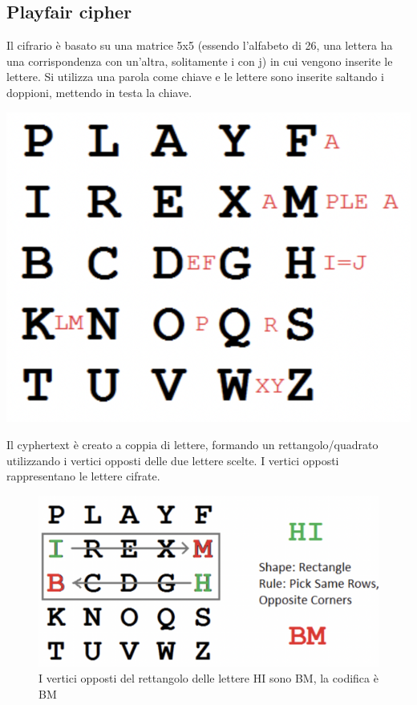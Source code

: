 \documentclass[11pt, oneside]{article}   	%
\begin{document}
\subsection*{Playfair cipher}
Il cifrario è basato su una matrice 5x5 (essendo l'alfabeto di 26, una lettera ha una corrispondenza con un'altra, solitamente i con j) in cui vengono inserite le lettere. Si utilizza una parola come chiave e le lettere sono inserite saltando i doppioni, mettendo in testa la chiave.
\begin{center}
\includegraphics[scale=0.5]{playfair}
\end{center}
Il cyphertext è creato a coppia di lettere, formando un rettangolo/quadrato utilizzando i vertici opposti delle due lettere scelte. I vertici opposti rappresentano le lettere cifrate.
\begin{figure} [H]
\begin{center}
\includegraphics[scale=0.5]{playfair2}
\caption{I vertici opposti del rettangolo delle lettere HI sono BM, la codifica è BM}
\end{center}
\end{figure}
\end{document}
